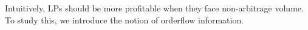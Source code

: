         Intuitively, LPs should be more profitable when they face non-arbitrage volume. To study this, we introduce the notion of orderflow information.




